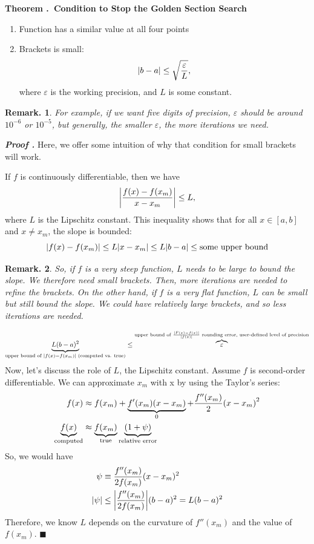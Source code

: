 \documentclass[12pt, a4paper]{article}
\newcounter{index}[subsection]
\newenvironment*{thm}[1]{\begin{tcolorbox}\par\noindent\textbf{Theorem \thesubsection.\stepcounter{index}\theindex\ #1} \par}{\par\end{tcolorbox}}
\newcounter{nprf}[subsection]
\newenvironment*{prf}{\par\indent\textbf{\textit{Proof \stepcounter{nprf}\thenprf.}}}{\hfill$\blacksquare$\par}
\newtheorem{rmk}{Remark.}[section]
\def\epsilon{\varepsilon}
\begin{document}
\begin{thm}{Condition to Stop the Golden Section Search}
	\begin{enumerate}
		\item Function has a similar value at all four points
		\item Brackets is small: \[\qty|b-a|\leq\sqrt{\dfrac{\epsilon}{L}},\] where $\epsilon$ is the working precision, and $L$ is some constant. 
	\end{enumerate}	
	\begin{rmk}
		For example, if we want five digits of precision, $\epsilon$ should be around $10^{-6}$ or $10^{-5}$, but generally, the smaller $\epsilon$, the more iterations we need. 
	\end{rmk}
\end{thm}
\begin{prf}
	Here, we offer some intuition of why that condition for small brackets will work. \par If $f$ is continuously differentiable, then we have \[\qty|\dfrac{f(x)-f\qty(x_m)}{x-x_m}|\leq L,\] where $L$ is the Lipschitz constant. This inequality shows that for all $x\in[a,b]$ and $x\neq x_m$, the slope is bounded: \[\qty|f(x)-f(x_m)|\leq L\qty|x-x_m|\leq L\abs{b-a}\leq\text{some upper bound}\]
	\begin{rmk}	
	So, if $f$ is a very steep function, $L$ needs to be large to bound the slope. We therefore need small brackets. Then, more iterations are needed to refine the brackets. On the other hand, if $f$ is a very flat function, $L$ can be small but still bound the slope. We could have relatively large brackets, and so less iterations are needed. 
	\end{rmk}\par 
	\[\underbrace{L(b-a)^2}_{\text{upper bound of }\qty|f(x)-f(x_m)|\text{ (computed vs. true)}}\leq\overbrace{\epsilon}^{\text{upper bound of }\frac{|F(x)-f(x)|}{|f(x)|}\text{ rounding error, user-defined level of precision}}\]
	Now, let's discuss the role of $L$, the Lipschitz constant. Assume $f$ is second-order differentiable. We can approximate $x_m$ with x by using the Taylor's series: \begin{align*}f(x)&\approx f(x_m)+\underbrace{f'(x_m)(x-x_m)}_{0}+\dfrac{f''(x_m)}{2}\qty(x-x_m)^2\\\underbrace{f(x)}_\text{computed}&\approx\underbrace{f(x_m)}_\text{true}\underbrace{\qty(1+\psi)}_\text {relative error}\end{align*} So, we would have \begin{align*}\psi&\equiv\dfrac{f''(x_m)}{2f(x_m)}(x-x_m)^2\\\qty|\psi|&\leq\abs{\dfrac{f''(x_m)}{2f(x_m)}}(b-a)^2=L(b-a)^2\end{align*} Therefore, we know $L$ depends on the curvature of $f''(x_m)$ and the value of $f(x_m)$.
\end{prf}
\end{document}
